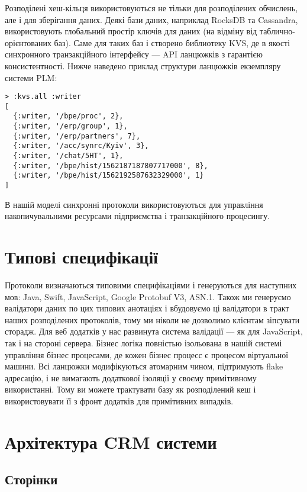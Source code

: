 Розподілені хеш-кільця використовуються не тільки для розподілених обчислень,
але і для зберігання даних.
Деякі бази даних, наприклад RocksDB та Cassandra, використовують глобальний простір
ключів для даних (на відміну від таблично-орієнтованих баз). Саме для таких
баз і створено библиотеку KVS, де в якості синхронного транзакційного
інтерфейсу — API ланцюжків з гарантією консистентності. Нижче
наведено приклад структури ланцюжків екземпляру системи PLM:

   \begin{lstlisting}
> :kvs.all :writer
[
  {:writer, '/bpe/proc', 2},
  {:writer, '/erp/group', 1},
  {:writer, '/erp/partners', 7},
  {:writer, '/acc/synrc/Kyiv', 3},
  {:writer, '/chat/5HT', 1},
  {:writer, '/bpe/hist/1562187187807717000', 8},
  {:writer, '/bpe/hist/1562192587632329000', 1}
]
\end{lstlisting}

В нашій моделі синхронні протоколи використовуються для управління
накопичувальними ресурсами підприємства і транзакційного процесингу.

\section{Типові специфікації}

Протоколи визначаються типовими специфікаціями і генеруються для наступних мов:
Java, Swift, JavaScript, Google Protobuf V3, ASN.1. Також ми генеруємо валідатори даних по цих
типових анотаціях і вбудовуємо ці валідатори в тракт наших розподілених протоколів,
тому ми ніколи не дозволимо клієнтам зіпсувати сторадж. Для веб додатків у нас развинута
система валідації — як для JavaScript, так і на стороні сервера. Бізнес логіка повністью ізольована в нашій
системі управління бізнес процесами, де кожен бізнес процесс
є процесом віртуальної машини. Всі ланцюжки модифікуються атомарним чином,
підтримують flake адресацію, і не вимагають додаткової ізоляції
у своєму примітивному використанні.
Тому ви можете трактувати базу як розподілений кеш
і використовувати її з фронт додатків для примітивних випадків.

\section{Архітектура CRM системи}

\subsection{Сторінки}

